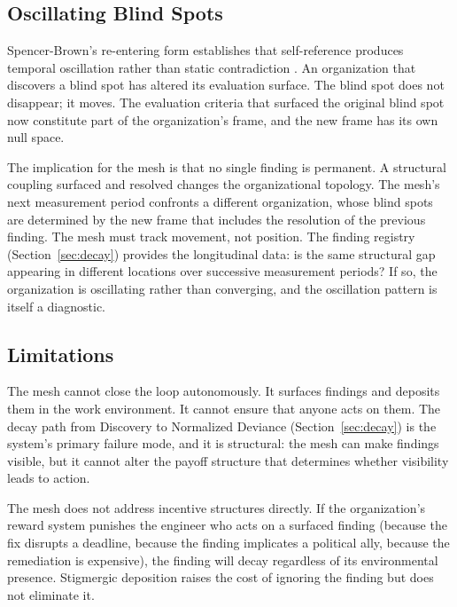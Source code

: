 \documentclass[11pt,a4paper]{article}
\begin{document}
\subsection{Oscillating Blind Spots}
\label{sec:oscillating}

Spencer-Brown's re-entering form establishes that self-reference produces temporal oscillation rather than static contradiction \citep{spencerbrown1969}. An organization that discovers a blind spot has altered its evaluation surface. The blind spot does not disappear; it moves. The evaluation criteria that surfaced the original blind spot now constitute part of the organization's frame, and the new frame has its own null space.

The implication for the mesh is that no single finding is permanent. A structural coupling surfaced and resolved changes the organizational topology. The mesh's next measurement period confronts a different organization, whose blind spots are determined by the new frame that includes the resolution of the previous finding. The mesh must track movement, not position. The finding registry (Section~\ref{sec:decay}) provides the longitudinal data: is the same structural gap appearing in different locations over successive measurement periods? If so, the organization is oscillating rather than converging, and the oscillation pattern is itself a diagnostic.


\subsection{Limitations}
\label{sec:limitations}

The mesh cannot close the loop autonomously. It surfaces findings and deposits them in the work environment. It cannot ensure that anyone acts on them. The decay path from Discovery to Normalized Deviance (Section~\ref{sec:decay}) is the system's primary failure mode, and it is structural: the mesh can make findings visible, but it cannot alter the payoff structure that determines whether visibility leads to action.

The mesh does not address incentive structures directly. If the organization's reward system punishes the engineer who acts on a surfaced finding (because the fix disrupts a deadline, because the finding implicates a political ally, because the remediation is expensive), the finding will decay regardless of its environmental presence. Stigmergic deposition raises the cost of ignoring the finding but does not eliminate it.
\end{document}
